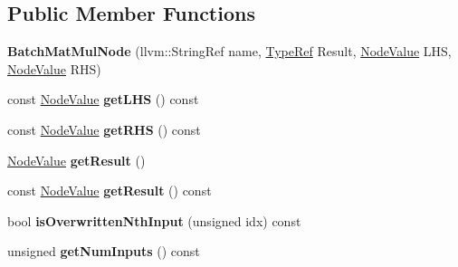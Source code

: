 \subsection*{Public Member Functions}
\begin{DoxyCompactItemize}
\item 
\mbox{\label{classglow_1_1_batch_mat_mul_node_a4b34edc66d0a5c407e066436ea76986e}} 
{\bfseries Batch\+Mat\+Mul\+Node} (llvm\+::\+String\+Ref name, \hyperlink{structglow_1_1_type}{Type\+Ref} Result, \hyperlink{structglow_1_1_node_value}{Node\+Value} L\+HS, \hyperlink{structglow_1_1_node_value}{Node\+Value} R\+HS)
\item 
\mbox{\label{classglow_1_1_batch_mat_mul_node_a14defdd1a65311f1e240870bb2ea0139}} 
const \hyperlink{structglow_1_1_node_value}{Node\+Value} {\bfseries get\+L\+HS} () const
\item 
\mbox{\label{classglow_1_1_batch_mat_mul_node_a8c1e2d365c8496717ee18af3d26aa298}} 
const \hyperlink{structglow_1_1_node_value}{Node\+Value} {\bfseries get\+R\+HS} () const
\item 
\mbox{\label{classglow_1_1_batch_mat_mul_node_abad390750eec9f5a2ee8c5031b9e5a2a}} 
\hyperlink{structglow_1_1_node_value}{Node\+Value} {\bfseries get\+Result} ()
\item 
\mbox{\label{classglow_1_1_batch_mat_mul_node_a9ac041e8dd5453c63d4b40c538db8eb9}} 
const \hyperlink{structglow_1_1_node_value}{Node\+Value} {\bfseries get\+Result} () const
\item 
\mbox{\label{classglow_1_1_batch_mat_mul_node_a183a81ddbbac1e44302bdb8882dfe250}} 
bool {\bfseries is\+Overwritten\+Nth\+Input} (unsigned idx) const
\item 
\mbox{\label{classglow_1_1_batch_mat_mul_node_aa8ba39e7ca651abde509d37e8d97ee58}} 
unsigned {\bfseries get\+Num\+Inputs} () const
\item 
\mbox{\label{classglow_1_1_batch_mat_mul_node_a9b8b62a08b3a7478ab87b9872c17b2ee}} 

\end{DoxyCompactItemize}
